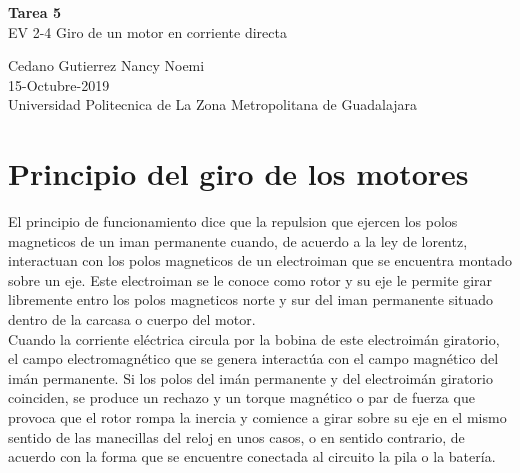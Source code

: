 \documentclass[11pt,a4paper]{article}
\begin{document}
\begin{center}
\textbf{Tarea 5}\\
EV 2-4 Giro de un motor en corriente directa
\end{center}

\begin{center}
Cedano Gutierrez Nancy Noemi\\
15-Octubre-2019\\
Universidad Politecnica de La Zona Metropolitana de Guadalajara
\end{center}
\section{Principio del giro de los motores}
El principio de funcionamiento dice que la repulsion que ejercen los polos magneticos de un iman permanente cuando, de acuerdo a la ley de lorentz, interactuan con los polos magneticos de un electroiman que se encuentra montado sobre un eje. 	Este electroiman se le conoce como rotor y su eje le permite girar libremente entro los polos magneticos norte y sur del iman permanente situado dentro de la carcasa o cuerpo del motor.\\
Cuando la corriente eléctrica circula por la bobina de este electroimán giratorio, el campo electromagnético que se genera interactúa con el campo magnético del imán permanente. Si los polos del imán permanente y del electroimán giratorio coinciden, se produce un rechazo y un torque magnético o par de fuerza que provoca que el rotor rompa la inercia y comience a girar sobre su eje en el mismo sentido de las manecillas del reloj en unos casos, o en sentido contrario, de acuerdo con la forma que se encuentre conectada al circuito la pila o la batería.\\
\end{document}
